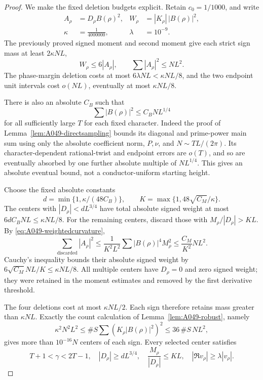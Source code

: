 \begin{proof}
We make the fixed deletion budgets explicit. Retain
\(c_0=1/1000\), and write
\begin{align*}
 A_\rho&=D_\rho B(\rho)^2,&
 W_\rho&=|K_\rho|\,|B(\rho)|^2,\\
 \kappa&=\frac1{4000000},&
 \lambda&=10^{-9}.
\end{align*}
The previously proved signed moment and second moment
give each strict sign mass at least \(2\kappa NL\),
\[
                       W_\rho\le6|A_\rho|,\qquad
                       \sum|A_\rho|^2\le NL^2.
\]
The phase-margin deletion costs at most
\(6\lambda NL<\kappa NL/8\), and the two endpoint unit
intervals cost \(o(NL)\), eventually at most \(\kappa NL/8\).

There is also an absolute \(C_B\) such that
\begin{equation}\label{eq:A049-absolute-sampleconstant}
                         \sum|B(\rho)|^2\le C_BNL^{1/4}
\end{equation}
for all sufficiently large \(T\) for each fixed character.
Indeed the proof of Lemma~\ref{lem:A049-directsampling}
bounds its diagonal and prime-power main sum using only
the absolute coefficient norm, \(P,\nu\), and
\(N\sim TL/(2\pi)\). Its character-dependent rational-twist
and endpoint errors are \(o(T)\), and so are eventually
absorbed by one further absolute multiple of \(NL^{1/4}\).
This gives an absolute eventual bound, not a
conductor-uniform starting height.

Choose the fixed absolute constants
\[
 d=\min\{1,\kappa/(48C_B)\},\qquad
 K=\max\{1,48\sqrt{C_M}/\kappa\}.
\]
The centers with \(|D_\rho|<dL^{3/4}\) have total absolute
signed weight at most \(6dC_BNL\le\kappa NL/8\).
For the remaining centers, discard those with
\(M_\rho/|D_\rho|>KL\). By
\eqref{eq:A049-weightedcurvature},
\[
 \sum_{\mathrm{discarded}}|A_\rho|^2
    \le\frac1{K^2L^2}\sum |B(\rho)|^4M_\rho^2
    \le\frac{C_M}{K^2}NL^2.
\]
Cauchy's inequality bounds their absolute signed weight
by \(6\sqrt{C_M}NL/K\le\kappa NL/8\).
All multiple centers have \(D_\rho=0\) and zero signed
weight; they were retained in the moment estimates and
removed by the first derivative threshold.

The four deletions cost at most \(\kappa NL/2\).
Each sign therefore retains mass greater than \(\kappa NL\).
Exactly the count calculation of
Lemma~\ref{lem:A049-robust}, namely
\[
 \kappa^2N^2L^2\le
        \#S\sum (K_\rho|B(\rho)|^2)^2
                       \le36\,\#S\,NL^2,
\]
gives more than \(10^{-16}N\) centers of each sign.
Every selected center satisfies
\[
 T+1<\gamma<2T-1,\quad
 |D_\rho|\ge dL^{3/4},\quad
 \frac{M_\rho}{|D_\rho|}\le KL,\quad
                 |\Re v_\rho|\ge\lambda|v_\rho|.
\]


\end{proof}
